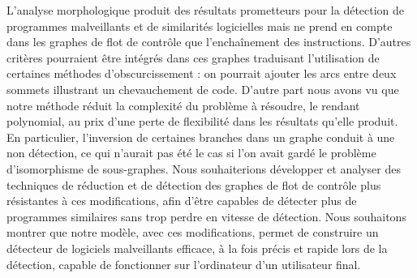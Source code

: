 L'analyse morphologique produit des résultats prometteurs pour la détection de programmes malveillants et de similarités logicielles mais ne prend en compte dans les graphes de flot de contrôle que l'enchaînement des instructions. D'autres critères pourraient être intégrés dans ces graphes traduisant l'utilisation de certaines méthodes d'obscurcissement : on pourrait ajouter les arcs entre deux sommets illustrant un chevauchement de code.
D'autre part nous avons vu que notre méthode réduit la complexité du problème à résoudre, le rendant polynomial, au prix d'une perte de flexibilité dans les résultats qu'elle produit.
En particulier, l'inversion de certaines branches  dans un graphe conduit à une non détection, ce qui n'aurait pas été le cas si l'on avait gardé le problème d'isomorphisme de sous-graphes.
Nous souhaiterions développer et analyser des techniques de réduction et de détection des graphes de flot de contrôle plus résistantes à ces modifications, afin d'être capables de détecter plus de programmes similaires sans trop perdre en vitesse de détection.
Nous souhaitons montrer que notre modèle, avec ces modifications, permet de construire un détecteur de logiciels malveillants efficace, à la fois précis et rapide lors de la détection, capable de fonctionner sur l'ordinateur d'un utilisateur final.


